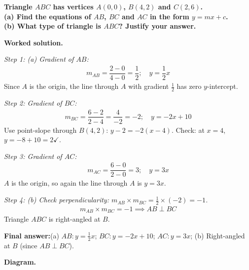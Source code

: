 \documentclass[11pt]{article}
\newcommand{\question}[1]{\par\medskip\noindent\textbf{#1}\par}
\begin{document}
\question{Triangle \( ABC \) has vertices \( A(0, 0) \), \( B(4, 2) \) and \( C(2, 6) \). \\[3pt] (a) Find the equations of \( AB \), \( BC \) and \( AC \) in the form \( y = mx + c \). \\[3pt] (b) What type of triangle is \( ABC \)? Justify your answer.}

\textbf{Worked solution.}

\textit{Step 1: (a) Gradient of \( AB \):}
\[\begin{gathered}
m_{AB} = \dfrac{2-0}{4-0} = \dfrac{1}{2}; \quad y = \dfrac{1}{2}x
\end{gathered}\]
Since \( A \) is the origin, the line through \( A \) with gradient \( \tfrac{1}{2} \) has zero \( y \)-intercept.

\textit{Step 2: Gradient of \( BC \):}
\[\begin{gathered}
m_{BC} = \dfrac{6-2}{2-4} = \dfrac{4}{-2} = -2; \quad y = -2x + 10
\end{gathered}\]
Use point-slope through \( B(4, 2) \): \( y - 2 = -2(x - 4) \). Check: at \( x=4 \), \( y=-8+10=2 \checkmark \).

\textit{Step 3: Gradient of \( AC \):}
\[\begin{gathered}
m_{AC} = \dfrac{6-0}{2-0} = 3; \quad y = 3x
\end{gathered}\]
\( A \) is the origin, so again the line through \( A \) is \( y = 3x \).

\textit{Step 4: (b) Check perpendicularity: \( m_{AB} \times m_{BC} = \frac{1}{2} \times (-2) = -1 \).}
\[\begin{gathered}
m_{AB} \times m_{BC} = -1 \implies AB \perp BC
\end{gathered}\]
Triangle \( ABC \) is right-angled at \( B \).

\begin{answerbox}
\textbf{Final answer:}\quad (a) \(\displaystyle AB: y=\frac{1}{2}x\); \(\displaystyle BC: y=-2x+10\); \(\displaystyle AC: y=3x\); (b) Right-angled at \(\displaystyle B\) (since \(\displaystyle AB \perp BC\)).
\end{answerbox}
\textbf{Diagram.}
\end{document}
